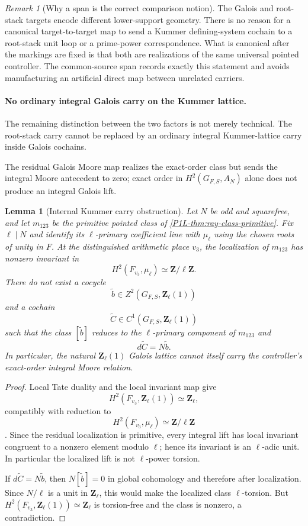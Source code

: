 \documentclass[11pt]{article}
\newtheorem{lemma}[theorem]{Lemma}
\theoremstyle{remark}
\newtheorem{remark}[theorem]{Remark}
\newcommand{\Z}{\mathbf Z}
\begin{document}
\begin{remark}[Why a span is the correct comparison notion]\label{P1L-rem:span-not-direct-map}
The Galois and root-stack targets encode different lower-support geometry.  There is no reason for a canonical target-to-target map to send a Kummer defining-system cochain to a root-stack unit loop or a prime-power correspondence.  What is canonical after the markings are fixed is that both are realizations of the same universal pointed controller.  The common-source span records exactly this statement and avoids manufacturing an artificial direct map between unrelated carriers.
\end{remark}

\paragraph{No ordinary integral Galois carry on the Kummer lattice.}

The remaining distinction between the two factors is not merely technical.  The root-stack carry cannot be replaced by an ordinary integral Kummer-lattice carry inside Galois cochains.

The residual Galois Moore map realizes the exact-order class but sends the
integral Moore antecedent to zero; exact order in
\(H^2(G_{F,S},A_N)\) alone does not produce an integral Galois lift.

\begin{lemma}[Internal Kummer carry obstruction]\label{P1L-thm:internal-galois-carry-no-go}
Let $N$ be odd and squarefree, and let $m_{123}$ be the primitive pointed class of \cref{P1L-thm:ray-class-primitive}.  Fix $\ell\mid N$ and identify its $\ell$-primary coefficient line with $\mu_\ell$ using the chosen roots of unity in $F$.  At the distinguished arithmetic place $v_3$, the localization of $m_{123}$ has nonzero invariant in
\[
 H^2(F_{v_3},\mu_\ell)\simeq\Z/\ell\Z.
\]
There do not exist a cocycle
\[
 \widetilde b\in Z^2(G_{F,S},\Z_\ell(1))
\]
and a cochain
\[
 \widetilde C\in C^1(G_{F,S},\Z_\ell(1))
\]
such that the class $[\widetilde b]$ reduces to the $\ell$-primary component of $m_{123}$ and
\[
 d\widetilde C=N\widetilde b.
\]
In particular, the natural $\Z_\ell(1)$ Galois lattice cannot itself carry the controller's exact-order integral Moore relation.
\end{lemma}

\begin{proof}
Local Tate duality and the local invariant map give
\[
 H^2(F_{v_3},\Z_\ell(1))\simeq\Z_\ell,
\]
compatibly with reduction to
\[
 H^2(F_{v_3},\mu_\ell)\simeq\Z/\ell\Z
\]
\cite{MilneCFT}.  Since the residual localization is primitive, every integral lift has local invariant congruent to a nonzero element modulo $\ell$; hence its invariant is an $\ell$-adic unit.  In particular the localized lift is not $\ell$-power torsion.

If $d\widetilde C=N\widetilde b$, then $N[\widetilde b]=0$ in global cohomology and therefore after localization.  Since $N/\ell$ is a unit in $\Z_\ell$, this would make the localized class $\ell$-torsion.  But $H^2(F_{v_3},\Z_\ell(1))\simeq\Z_\ell$ is torsion-free and the class is nonzero, a contradiction.
\end{proof}
\end{document}
